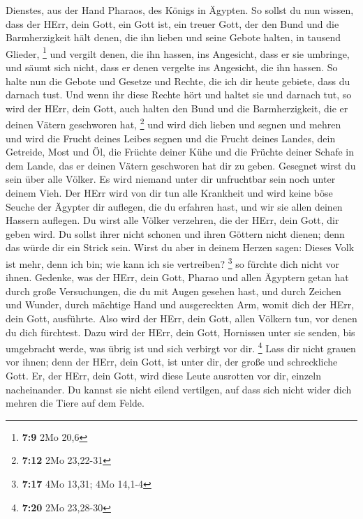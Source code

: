 Dienstes, aus der Hand Pharaos, des Königs in Ägypten.  So
sollst du nun wissen, dass der HErr, dein Gott, ein Gott ist, ein treuer
Gott, der den Bund und die Barmherzigkeit hält denen, die ihn lieben und
seine Gebote halten, in tausend Glieder, \footnote{\textbf{7:9} 2Mo 20,6}
 und vergilt denen, die ihn hassen, ins Angesicht, dass er
sie umbringe, und säumt sich nicht, dass er denen vergelte ins
Angesicht, die ihn hassen.  So halte nun die Gebote und
Gesetze und Rechte, die ich dir heute gebiete, dass du darnach tust.
 Und wenn ihr diese Rechte hört und haltet sie und darnach
tut, so wird der HErr, dein Gott, auch halten den Bund und die
Barmherzigkeit, die er deinen Vätern geschworen hat, \footnote{\textbf{7:12}
  2Mo 23,22-31}  und wird dich lieben und segnen und mehren
und wird die Frucht deines Leibes segnen und die Frucht deines Landes,
dein Getreide, Most und Öl, die Früchte deiner Kühe und die Früchte
deiner Schafe in dem Lande, das er deinen Vätern geschworen hat dir zu
geben.  Gesegnet wirst du sein über alle Völker. Es wird
niemand unter dir unfruchtbar sein noch unter deinem Vieh. 
Der HErr wird von dir tun alle Krankheit und wird keine böse Seuche der
Ägypter dir auflegen, die du erfahren hast, und wir sie allen deinen
Hassern auflegen.  Du wirst alle Völker verzehren, die der
HErr, dein Gott, dir geben wird. Du sollst ihrer nicht schonen und ihren
Göttern nicht dienen; denn das würde dir ein Strick sein. 
Wirst du aber in deinem Herzen sagen: Dieses Volk ist mehr, denn ich
bin; wie kann ich sie vertreiben? \footnote{\textbf{7:17} 4Mo 13,31; 4Mo
  14,1-4}  so fürchte dich nicht vor ihnen. Gedenke, was
der HErr, dein Gott, Pharao und allen Ägyptern getan hat 
durch große Versuchungen, die du mit Augen gesehen hast, und durch
Zeichen und Wunder, durch mächtige Hand und ausgereckten Arm, womit dich
der HErr, dein Gott, ausführte. Also wird der HErr, dein Gott, allen
Völkern tun, vor denen du dich fürchtest.  Dazu wird der
HErr, dein Gott, Hornissen unter sie senden, bis umgebracht werde, was
übrig ist und sich verbirgt vor dir. \footnote{\textbf{7:20} 2Mo
  23,28-30}  Lass dir nicht grauen vor ihnen; denn der
HErr, dein Gott, ist unter dir, der große und schreckliche Gott.
 Er, der HErr, dein Gott, wird diese Leute ausrotten vor
dir, einzeln nacheinander. Du kannst sie nicht eilend vertilgen, auf
dass sich nicht wider dich mehren die Tiere auf dem Felde. 
